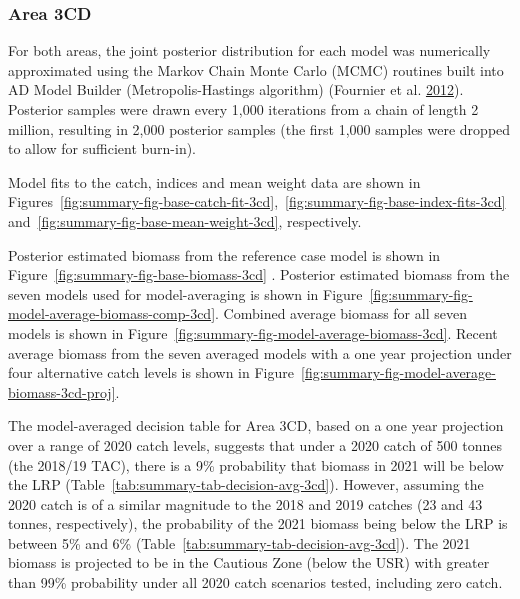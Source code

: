 \documentclass[11pt]{book}
\begin{document}
\hypertarget{area-3cd}{%
\subsubsection{Area 3CD}\label{area-3cd}}

For both areas, the joint posterior distribution for each model was numerically approximated using the Markov Chain Monte Carlo (MCMC) routines built into AD Model Builder (Metropolis-Hastings algorithm) (Fournier et al. \protect\hyperlink{ref-fournier2012}{2012}). Posterior samples were drawn every 1,000 iterations from a chain of length 2 million, resulting in 2,000 posterior samples (the first 1,000 samples were dropped to allow for sufficient burn-in).

Model fits to the catch, indices and mean weight data are shown in Figures~\ref{fig:summary-fig-base-catch-fit-3cd},~\ref{fig:summary-fig-base-index-fits-3cd} and~\ref{fig:summary-fig-base-mean-weight-3cd}, respectively.

Posterior estimated biomass from the reference case model is shown in Figure~\ref{fig:summary-fig-base-biomass-3cd} . Posterior estimated biomass from the seven models used for model-averaging is shown in Figure~\ref{fig:summary-fig-model-average-biomass-comp-3cd}. Combined average biomass for all seven models is shown in Figure~\ref{fig:summary-fig-model-average-biomass-3cd}. Recent average biomass from the seven averaged models with a one year projection under four alternative catch levels is shown in Figure~\ref{fig:summary-fig-model-average-biomass-3cd-proj}.

The model-averaged decision table for Area 3CD, based on a one year projection over a range of 2020 catch levels, suggests that under a 2020 catch of 500 tonnes (the 2018/19 TAC), there is a 9\% probability that biomass in 2021 will be below the LRP (Table~\ref{tab:summary-tab-decision-avg-3cd}). However, assuming the 2020 catch is of a similar magnitude to the 2018 and 2019 catches (23 and 43 tonnes, respectively), the probability of the 2021 biomass being below the LRP is between 5\% and 6\% (Table~\ref{tab:summary-tab-decision-avg-3cd}). The 2021 biomass is projected to be in the Cautious Zone (below the USR) with greater than 99\% probability under all 2020 catch scenarios tested, including zero catch.
\end{document}
